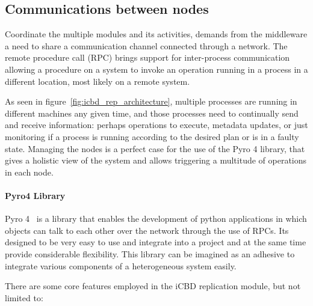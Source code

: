 \subsection{Communications between nodes}
\label{sub:rep_comms}

Coordinate the multiple modules and its activities, demands from the middleware a need to share a communication channel connected through a network. 
The remote procedure call (RPC) brings support for inter-process communication allowing a procedure on a system to invoke an operation running in a process in a different location, most likely on a remote system.

As seen in figure~\ref{fig:icbd_rep_architecture}, multiple processes are running in different machines any given time, and those processes need to continually send and receive information: perhaps operations to execute, metadata updates, or just monitoring if a process is running according to the desired plan or is in a faulty state.
Managing the nodes is a perfect case for the use of the Pyro 4 library, that gives a holistic view of the system and allows triggering a multitude of operations in each node.


\paragraph{Pyro4 Library}
\label{par:rep_pyro4}
Pyro 4~\cite{pyro4} is a library that enables the development of python applications in which objects can talk to each other over the network through the use of RPCs. Its designed to be very easy to use and integrate into a project and at the same time provide considerable flexibility. This library can be imagined as an adhesive to integrate various components of a heterogeneous system easily.

There are some core features employed in the iCBD replication module, but not limited to:


